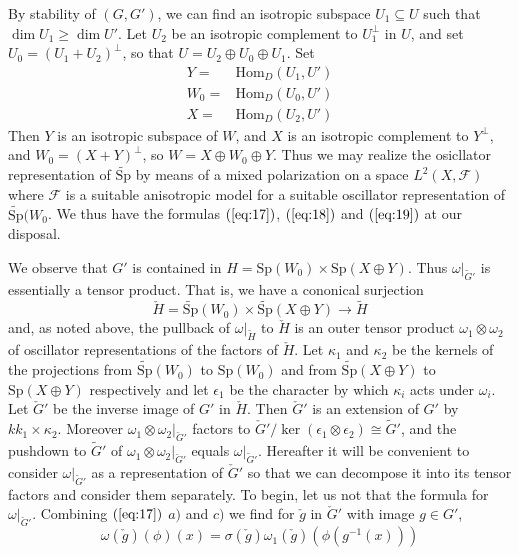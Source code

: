\documentclass[12pt]{amsart}
\def\Sp{{\mathrm{Sp}}}
\def\tSp{{\widetilde{\mathrm{Sp}}}}
\def\Hom{{\mathrm{Hom}}}
\def\tG{{\widetilde{G}}}
\def\cG{{\check{G}}}
\def\cg{{\check{g}}}
\def\tH{{\widetilde{H}}}
\def\cH{{\check{H}}}
\def\kk{\kappa}
\def\cff{{\mathcal{F}}}
\begin{document}
By stability of $(G,G')$, we can find an isotropic subspace $U_1\subseteq U$
such that $\dim U_1 \geq \dim U'$. Let $U_2$ be an isotropic 
complement to $U_1^\perp$ in $U$, and set $U_0=(U_1+U_2)^\perp$, 
so that $U=U_2\oplus U_0 \oplus U_1$. Set
\begin{equation}\label{eq:24}
\begin{split}
Y =& \Hom_D(U_1,U')\\
W_0 =& \Hom_D(U_0,U')\\
X=& \Hom_D(U_2,U')
\end{split}
\end{equation}
Then $Y$ is an isotropic subspace of $W$, and $X$ is an isotropic complement 
to $Y^\perp$, and $W_0=(X+Y)^\perp$, so $W=X\oplus W_0\oplus Y$. Thus we may
realize the osicllator representation of $\tSp$ by means of a mixed 
polarization on a space $L^2(X,\cff)$ where $\cff$ is a suitable 
anisotropic model for a suitable oscillator representation of $\tSp(W_0$. 
We thus have the formulas $(\ref{eq:17})$, $(\ref{eq:18})$ and $(\ref{eq:19})$
at our disposal.

We observe that $G'$ is contained in $H=\Sp(W_0)\times\Sp(X\oplus Y)$. 
Thus $\omega|_{\tG'}$ is essentially a tensor product. That is, 
we have a cononical surjection
\[
\cH = \tSp(W_0)\times \tSp(X\oplus Y) \to \tH
\]
and, as noted above, the pullback of $\omega|_\tH$ to $\cH$ is an 
outer tensor product $\omega_1\otimes \omega_2$ of oscillator 
representations of the factors of $\cH$. 
Let $\kk_1$ and $\kk_2$ be the kernels of the projections from
$\tSp(W_0)$ to $\Sp(W_0)$ and from $\tSp(X\oplus Y)$ to $\Sp(X\oplus Y)$
respectively and let $\epsilon_1$ be the character by which
$\kk_i$ acts under $\omega_i$. Let $\cG'$ be the inverse image of
$G'$ in $\cH$. Then $\cG'$ is an extension of $G'$ by $kk_1\times \kk_2$. 
Moreover $\omega_1\otimes \omega_2|_{\cG'}$ factors to 
$\cG'/\ker(\epsilon_1\otimes \epsilon_2)\cong \tG'$, and 
the pushdown to $\tG'$ of $\omega_1\otimes \omega_2|_{\cG'}$ equals
$\omega|_{\tG'}$. Hereafter it will be convenient to consider $\omega|_{\tG'}$
as a representation of $\cG'$ so that we can decompose it into its tensor 
factors and consider them separately. 
To begin, let us not that the formula for $\omega|_{\cG'}$. Combining
$(\ref{eq:17})$  $a)$ and $c)$ we find for $\cg$ in $\cG'$ with 
image $g\in G'$,
\begin{equation}\label{eq:25}
\omega(\cg)(\phi)(x) = \sigma(\cg)\omega_1(\cg)(\phi(g^{-1}(x)))
\end{equation}
\end{document}
